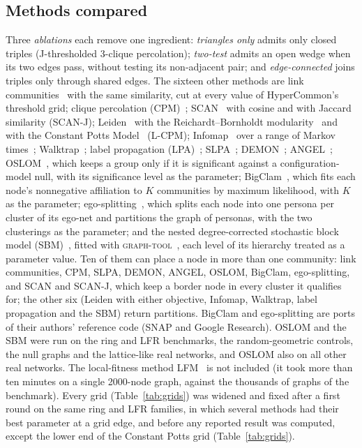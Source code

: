 \subsection{Methods compared}
\label{sec:methods}

Three \emph{ablations} each remove one ingredient: \emph{triangles only} admits only
closed triples (J-thresholded 3-clique percolation); \emph{two-test} admits an open
wedge when its two edges pass, without testing its non-adjacent pair; and
\emph{edge-connected} joins triples only through shared edges. The sixteen other
methods are link communities~\cite{ahn2010link} with the same similarity, cut at every
value of HyperCommon's threshold grid; clique percolation
(CPM)~\cite{palla2005uncovering}; SCAN~\cite{xu2007scan} with cosine and with Jaccard
similarity (SCAN-J); Leiden~\cite{traag2019leiden} with the Reichardt--Bornholdt
modularity~\cite{reichardt2006statistical} and with the Constant Potts
Model~\cite{traag2011narrow} (L-CPM); Infomap~\cite{rosvall2008maps} over a range of
Markov times~\cite{schaub2012markov,kheirkhahzadeh2016efficient};
Walktrap~\cite{pons2006walktrap}; label propagation (LPA)~\cite{raghavan2007near};
SLPA~\cite{xie2011slpa}; DEMON~\cite{coscia2012demon}; ANGEL~\cite{rossetti2020angel};
OSLOM~\cite{lancichinetti2011finding}, which keeps a group only if it is significant
against a configuration-model null, with its significance level as the parameter;
BigClam~\cite{yang2013overlapping}, which fits each node's nonnegative affiliation to $K$
communities by maximum likelihood, with $K$ as the parameter; ego-splitting~\cite{epasto2017ego},
which splits each node into one persona per cluster of its ego-net and partitions the
graph of personas, with the two clusterings as the parameter; and
the nested degree-corrected stochastic block model (SBM)~\cite{peixoto2014hierarchical},
fitted with \textsc{graph-tool}~\cite{peixoto_graphtool}, each level of its hierarchy
treated as a parameter value. Ten of them can place a node in more than one community: link communities, CPM, SLPA, DEMON, ANGEL, OSLOM, BigClam, ego-splitting, and SCAN and SCAN-J, which keep a border node in every cluster it qualifies for; the other six (Leiden with either objective, Infomap, Walktrap, label propagation and the SBM) return partitions. BigClam and ego-splitting are ports of their authors'
reference code (SNAP and Google Research). OSLOM and the SBM were run on the ring and LFR benchmarks,
the random-geometric controls, the null graphs and the lattice-like real networks, and
OSLOM also on all other real networks.
The local-fitness method LFM~\cite{lancichinetti2009lfm} is not included (it took more than
ten minutes on a single 2000-node graph, against the thousands of graphs of the
benchmark). Every grid (Table~\ref{tab:grids}) was widened and fixed after a first round on the same
ring and LFR families, in which several methods had their best parameter at a grid edge,
and before any reported result was computed, except the lower end of the Constant Potts grid (Table~\ref{tab:grids}).

